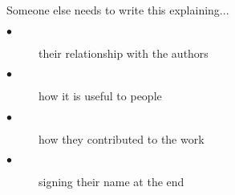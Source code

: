 Someone else needs to write this explaining...
\begin{description}
\item[$\bullet$] their relationship with the authors
\item[$\bullet$] how it is useful to people
\item[$\bullet$] how they contributed to the work
\item[$\bullet$] signing their name at the end
\end{description}